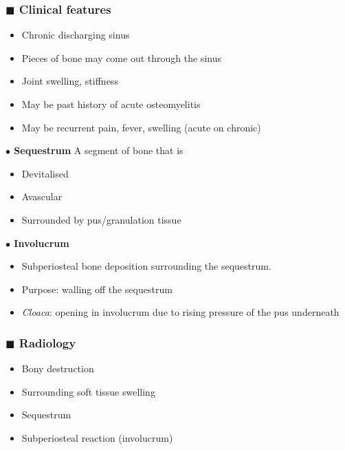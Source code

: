 \documentclass[
  12pt,
]{memoir}
\providecommand{\tightlist}{%
  \setlength{\itemsep}{0pt}\setlength{\parskip}{0pt}}
\begin{document}
\hypertarget{blacksquare-clinical-features-1}{%
\subsubsection{\texorpdfstring{\(\blacksquare\) Clinical
features}{\textbackslash blacksquare Clinical features}}\label{blacksquare-clinical-features-1}}

\begin{itemize}
\tightlist
\item
  Chronic discharging sinus
\item
  Pieces of bone may come out through the sinus
\item
  Joint swelling, stiffness
\item
  May be past history of acute osteomyelitis
\item
  May be recurrent pain, fever, swelling (acute on chronic)
\end{itemize}

\textbf{\(\bullet\) Sequestrum} A segment of bone that is

\begin{itemize}
\tightlist
\item
  Devitalised
\item
  Avascular
\item
  Surrounded by pus/granulation tissue
\end{itemize}

\textbf{\(\bullet\) Involucrum}

\begin{itemize}
\tightlist
\item
  Subperiosteal bone deposition surrounding the sequestrum.
\item
  Purpose: walling off the sequestrum
\item
  \emph{Cloaca}: opening in involucrum due to rising pressure of the pus
  underneath
\end{itemize}

\hypertarget{blacksquare-radiology-1}{%
\subsubsection{\texorpdfstring{\(\blacksquare\)
Radiology}{\textbackslash blacksquare Radiology}}\label{blacksquare-radiology-1}}

\begin{itemize}
\tightlist
\item
  Bony destruction
\item
  Surrounding soft tissue swelling
\item
  Sequestrum
\item
  Subperiosteal reaction (involucrum)
\end{itemize}
\end{document}
